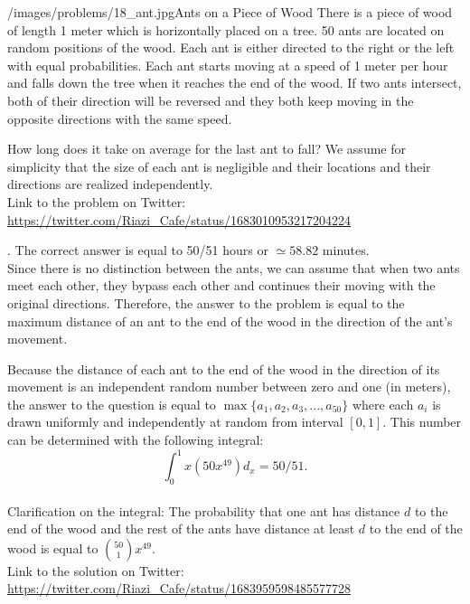 \begin{problem}{/images/problems/18_ant.jpg}{Ants on a Piece of Wood} There is a piece of wood of length 1 meter which is horizontally placed on a tree. 50 ants are located on random positions of the wood. Each ant is either directed to the right or the left with equal probabilities. Each ant starts moving at a speed of 1 meter per hour and falls down the tree when it reaches the end of the wood. If two ants intersect, both of their direction will be reversed and they both keep moving in the opposite directions with the same speed.

How long does it take on average for the last ant to fall? We assume for simplicity that the size of each ant is negligible and their locations and their directions are realized independently. \\[0.2cm]

Link to the problem on Twitter: \url{https://twitter.com/Riazi_Cafe/status/1683010953217204224}\end{problem}
\begin{solution}.
The correct answer is equal to 50/51 hours or $\simeq 58.82$ minutes.\\[0.2cm]

Since  there is no distinction between the ants, we can assume that when two ants meet each other, they bypass each other and continues their moving with the original directions. Therefore, the answer to the problem is equal to the maximum distance of an ant to the end of the wood in the direction of the ant's movement.

Because the distance of each ant to the end of the wood in the direction of its movement is an independent random number between zero and one (in meters), the answer to the question is equal to $\max\{a_1, a_2, a_3, ..., a_{50}\}$ where each $a_i$ is drawn uniformly and independently at random from interval $[0,1]$. This number can be determined with the following integral:
$$\int_0^1 x(50x^{49}) d_x = 50/51.$$\\

Clarification on the integral: The probability that one ant has distance $d$ to the end of the wood and the rest of the ants have distance at least $d$ to the end of the wood is equal to $\binom{50}{1} x^{49}$.\\[0.2cm]

Link to the solution on Twitter:  \url{https://twitter.com/Riazi_Cafe/status/1683959598485577728}\end{solution}
